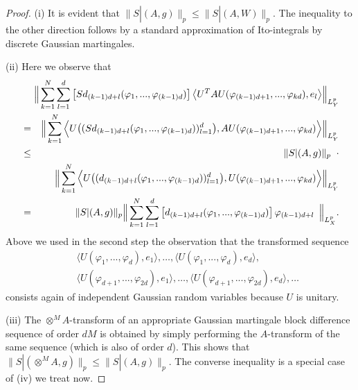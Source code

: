 \documentclass[11pt,a4paper,twoside,draft]{amsart}
\theoremstyle{definition}
\newcommand{\beqla}[1] {\begin {eqnarray}\label{#1}}
\def\eeq {\end {eqnarray}}
\newcommand{\ito}[3]{\| #1 |(#2 ,W)\|_{#3}}
\newcommand{\dito}[3]{\| #1 |(#2 ,g)\|_{#3}}
\begin{document}
\begin{proof}
(i) It is evident that $\dito{S}{A}{p}\leq\ito{S}{A}{p}.$ The
inequality to the other direction follows by a standard approximation
of Ito-integrals by discrete Gaussian martingales.
\medskip

(ii) Here we observe that 
\begin{eqnarray*}
&   & \hspace*{-1em}
      \Big \| \sum_{k=1}^N \sum_{l=1}^d
      \left [ Sd_{(k-1)d+l}(\varphi_1,...,\varphi_{(k-1)d}) \right ]
      \big \langle U^TAU(\varphi_{(k-1)d+1},...,\varphi_{kd}), e_l \big \rangle 
      \Big \|_{L^p_Y} \\
& = & \Big \| \sum_{k=1}^N 
      \Big \langle U \big ( (Sd_{(k-1)d+l}(\varphi_1,...,\varphi_{(k-1)d}))_{l=1}^d
                     \big ), AU (\varphi_{(k-1)d+1},...,\varphi_{kd})
       \Big \rangle \Big \|_{L^p_Y} \\
&\le& \dito{S}{A}{p} \;\; \cdot\\
&   & \Big \| \sum_{k=1}^N 
       \Big \langle U \big ( (d_{(k-1)d+l}(\varphi_1,...,\varphi_{(k-1)d}))_{l=1}^d
                     \big ),
                    U(\varphi_{(k-1)d+1},...,\varphi_{kd})
       \Big \rangle \Big \|_{L^p_Y} \\
& = & \dito{S}{A}{p} 
        \Big \|  \sum_{k=1}^N \sum_{l=1}^d 
          \left [ d_{(k-1)d+l}(\varphi_1,...,\varphi_{(k-1)d}) \right ]
          \varphi_{(k-1)d+l} \hspace{.5em}
          \Big \|_{L^p_X}.
\end{eqnarray*}
Above we used in the second step the observation that
the transformed sequence
\beqla{eq:3.400}
&   & \langle U(\varphi_{1},...,\varphi_{d}),e_1\rangle,
      \ldots,
      \langle U(\varphi_{1},...,\varphi_{d}),e_d\rangle, \nonumber\\
&   & \langle U(\varphi_{d+1},...,\varphi_{2d}),e_1\rangle,
      \ldots,
      \langle U(\varphi_{d+1},...,\varphi_{2d}),e_d\rangle, \ldots \nonumber
\eeq
consists again of independent Gaussian random variables because $U$ is unitary. 
\medskip

(iii) The $\otimes^M A$-transform of an appropriate
Gaussian martingale block difference sequence of order $dM$ 
is obtained by simply performing the $A$-transform
of the same sequence (which is also of order $d$). 
This shows that $\dito{S}{\otimes^M A}{p}\leq \dito{S}{A}{p}.$
The converse inequality is a special case of (iv) we treat now.

\medskip


\end{proof}
\end{document}
